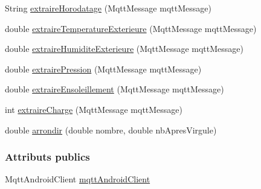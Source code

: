 \begin{DoxyCompactItemize}
String \hyperlink{classfr_1_1campus_1_1laurainc_1_1honeybee_1_1_client_m_q_t_t_ace17d633909a5be8035518b9a6b528c2}{extraire\+Horodatage} (Mqtt\+Message mqtt\+Message)
\item 
double \hyperlink{classfr_1_1campus_1_1laurainc_1_1honeybee_1_1_client_m_q_t_t_a5f9be292aa0e594c2f555f29abbb4fc9}{extraire\+Temperature\+Exterieure} (Mqtt\+Message mqtt\+Message)
\item 
double \hyperlink{classfr_1_1campus_1_1laurainc_1_1honeybee_1_1_client_m_q_t_t_a0a3be0588498643af9098ab70a7a837a}{extraire\+Humidite\+Exterieure} (Mqtt\+Message mqtt\+Message)
\item 
double \hyperlink{classfr_1_1campus_1_1laurainc_1_1honeybee_1_1_client_m_q_t_t_a630a29e060e4a0c2891cd79fad8d3585}{extraire\+Pression} (Mqtt\+Message mqtt\+Message)
\item 
double \hyperlink{classfr_1_1campus_1_1laurainc_1_1honeybee_1_1_client_m_q_t_t_a38a76fc07a1793ba1a94898bdcd5ecbd}{extraire\+Ensoleillement} (Mqtt\+Message mqtt\+Message)
\item 
int \hyperlink{classfr_1_1campus_1_1laurainc_1_1honeybee_1_1_client_m_q_t_t_a93572795db92f79f417982f4785b71e0}{extraire\+Charge} (Mqtt\+Message mqtt\+Message)
\item 
double \hyperlink{classfr_1_1campus_1_1laurainc_1_1honeybee_1_1_client_m_q_t_t_a00ce9a2b07615c9337e452b5a51fedbe}{arrondir} (double nombre, double nb\+Apres\+Virgule)
\end{DoxyCompactItemize}
\subsubsection*{Attributs publics}
\begin{DoxyCompactItemize}
\item 
Mqtt\+Android\+Client \hyperlink{classfr_1_1campus_1_1laurainc_1_1honeybee_1_1_client_m_q_t_t_a587a9b6c785448cf3e37dc92bcac7961}{mqtt\+Android\+Client}
\end{DoxyCompactItemize}
